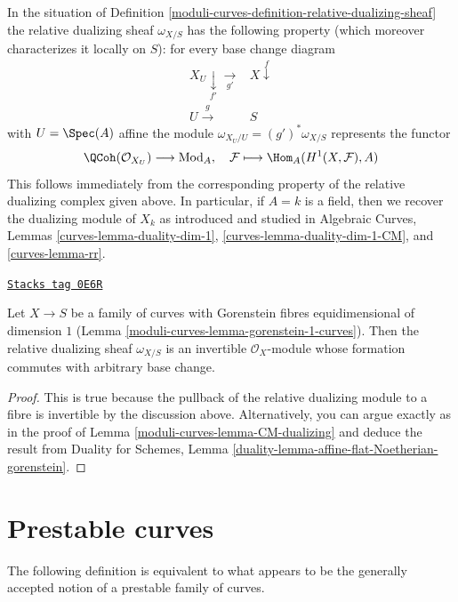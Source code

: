 In the situation of Definition \ref{moduli-curves-definition-relative-dualizing-sheaf}
the relative dualizing sheaf $\omega_{X/S}$ has the following property
(which moreover characterizes it locally on $S$):
for every base change diagram
$$
\begin{array}{cc}X_U \underset{f'}{\downarrow}\underset{g'}{\longrightarrow} & X \overset{f}{\downarrow} \\ U \overset{g}{\longrightarrow} & S\end{array}
$$
with $U = \Spec(A)$ affine the module $\omega_{X_U/U} = (g')^*\omega_{X/S}$
represents the functor
$$
\QCoh(\mathcal{O}_{X_U}) \longrightarrow \text{Mod}_A,\quad
\mathcal{F} \longmapsto \Hom_A(H^1(X, \mathcal{F}), A)
$$
This follows immediately from the corresponding property of the relative
dualizing complex given above. In particular, if $A = k$ is a field,
then we recover the dualizing module of $X_k$ as introduced and studied in
Algebraic Curves, Lemmas \ref{curves-lemma-duality-dim-1},
\ref{curves-lemma-duality-dim-1-CM}, and \ref{curves-lemma-rr}.

\begin{lemma}
\label{moduli-curves-lemma-gorenstein-dualizing}
\href{https://stacks.math.columbia.edu/tag/0E6R}{\texttt{Stacks tag 0E6R}}

Let $X \to S$ be a family of curves with Gorenstein fibres
equidimensional of dimension $1$ (Lemma \ref{moduli-curves-lemma-gorenstein-1-curves}).
Then the relative dualizing sheaf $\omega_{X/S}$ is an
invertible $\mathcal{O}_X$-module whose
formation commutes with arbitrary base change.
\end{lemma}

\begin{proof}
This is true because the pullback of the relative dualizing module
to a fibre is invertible by the discussion above. Alternatively, you
can argue exactly as in the proof of
Lemma \ref{moduli-curves-lemma-CM-dualizing} and deduce the result from
Duality for Schemes, Lemma
\ref{duality-lemma-affine-flat-Noetherian-gorenstein}.
\end{proof}

\section{Prestable curves}
\label{moduli-curves-section-prestable-curves}
The following definition is equivalent to what appears to be the
generally accepted notion of a prestable family of curves.

